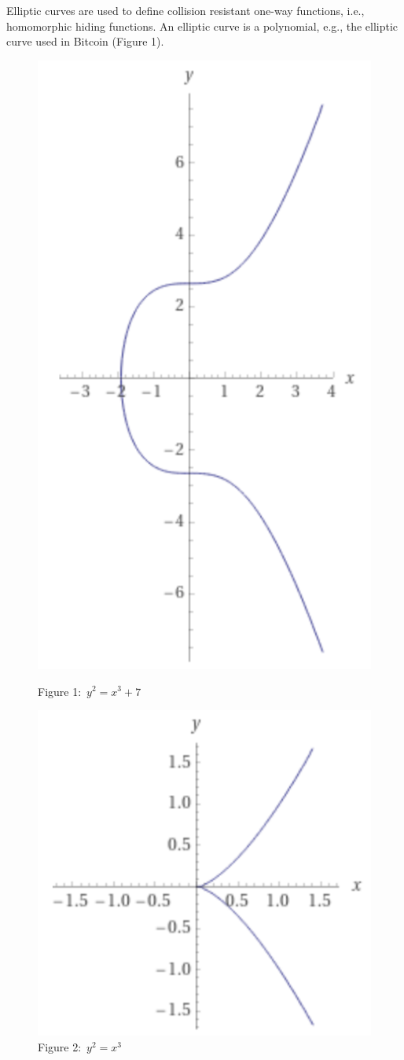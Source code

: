 Elliptic curves are used to define collision resistant one-way functions, i.e., homomorphic hiding functions. An elliptic curve is a polynomial, e.g., the elliptic curve used in Bitcoin (Figure 1). 

\begin{figure}
\centering
\begin{minipage}{.5\textwidth}
  \centering
  \includegraphics[width=.4\linewidth]{Pictures/bitcoinec.png}
  \caption{Figure 1:\ \(y^2 = x^3 +7\)}
  \label{fig:test1}
\end{minipage}%
\begin{minipage}{.5\textwidth}
  \centering
  \includegraphics[width=.4\linewidth]{Pictures/y2x3.png}
  \caption{Figure 2:\ \(y^2 = x^3\)}
  \label{fig:test2}
\end{minipage}
\end{figure}

